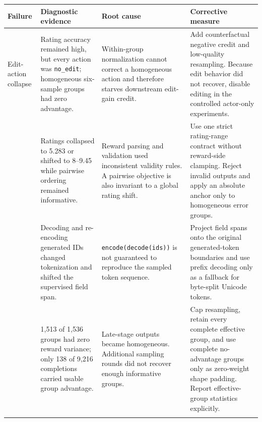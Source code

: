 \iffalse
\begin{table}[t]
\centering
{\small
\setlength{\tabcolsep}{3pt}
\renewcommand{\arraystretch}{0.96}
\begin{tabular}{@{}p{}p{}p{}p{}@{}}
\toprule
\textbf{Failure} & \textbf{Diagnostic evidence} & \textbf{Root cause} &
\textbf{Corrective measure} \\
\midrule
{\raggedright Edit-action collapse\par} &
Rating accuracy remained high, but every action was \texttt{no\_edit};
homogeneous six-sample groups had zero advantage. &
Within-group normalization cannot correct a homogeneous action and therefore
starves downstream edit-gain credit. &
Add counterfactual negative credit and low-quality resampling. Because edit
behavior did not recover, disable editing in the controlled actor-only
experiments. \\
\addlinespace[1pt]
{\raggedright Rating drift and invalid output\par} &
Ratings collapsed to 5.283 or shifted to 8--9.45 while pairwise ordering
remained informative. &
Reward parsing and validation used inconsistent validity rules. A pairwise
objective is also invariant to a global rating shift. &
Use one strict rating-range contract without reward-side clamping. Reject
invalid outputs and apply an absolute anchor only to homogeneous error groups. \\
\addlinespace[1pt]
{\raggedright Token-credit drift\par} &
Decoding and re-encoding generated IDs changed tokenization and shifted the
supervised field span. &
\texttt{encode(decode(ids))} is not guaranteed to reproduce the sampled token
sequence. &
Project field spans onto the original generated-token boundaries and use
prefix decoding only as a fallback for byte-split Unicode tokens. \\
\addlinespace[1pt]
{\raggedright Reward-variance collapse\par} &
1,513 of 1,536 groups had zero reward variance; only 138 of 9,216 completions
carried usable group advantage. &
Late-stage outputs became homogeneous. Additional sampling rounds did not
recover enough informative groups. &
Cap resampling, retain every complete effective group, and use complete
no-advantage groups only as zero-weight shape padding. Report effective-group
statistics explicitly. \\
\addlinespace[1pt]
{\raggedright Distributed underfill\par} &

\end{tabular}}
\end{table}
